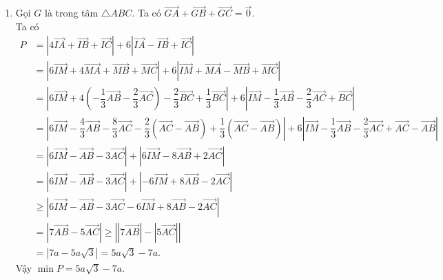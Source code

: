 \begin{bt}
{\begin{enumerate}
\begin{align*}
				&\overrightarrow{BM}=2 \overrightarrow{MC}
				\\
				\Leftrightarrow\,\,&\overrightarrow{BA}+\overrightarrow{AM}=2\left( \overrightarrow{MA}+\overrightarrow{AC}\right)
				\\
				\Leftrightarrow\,\,&-\overrightarrow{AB}+\overrightarrow{AM}=2\left(- \overrightarrow{AM}+\overrightarrow{AC}\right)
				\\
				\Leftrightarrow\,\,&3\overrightarrow{AM}= \overrightarrow{AB}+2\overrightarrow{AC}
				\\
				\Leftrightarrow\,\,&\overrightarrow{AM}=\dfrac{1}{3} \overrightarrow{AB}+\dfrac{2}{3} \overrightarrow{AC}.
			\end{align*}
			\item Gọi $G$ là trong tâm $\triangle ABC$. Ta có $\overrightarrow{GA}+\overrightarrow{GB}+\overrightarrow{GC}=\overrightarrow{0}$.
			\\
			Ta có 
			\allowdisplaybreaks
			\begin{align*}
				P&=\left| 4\overrightarrow{IA}+\overrightarrow{IB}+\overrightarrow{IC}\right|+6\left|\overrightarrow{IA}-\overrightarrow{IB}+\overrightarrow{IC}\right|
				\\
				&=\left| 6\overrightarrow{IM}+4\overrightarrow{MA}+\overrightarrow{MB}+\overrightarrow{MC}\right|+6\left|\overrightarrow{IM}+\overrightarrow{MA}-\overrightarrow{MB}+\overrightarrow{MC}\right|
				\\
				&=\left| 6\overrightarrow{IM}+4\left(-\dfrac{1}{3} \overrightarrow{AB}-\dfrac{2}{3} \overrightarrow{AC}\right)-\dfrac{2}{3}\overrightarrow{BC}+\dfrac{1}{3}\overrightarrow{BC}\right|+6\left|\overrightarrow{IM}-\dfrac{1}{3} \overrightarrow{AB}-\dfrac{2}{3} \overrightarrow{AC}+\overrightarrow{BC}\right|
				\\
				&=\left| 6\overrightarrow{IM}-\dfrac{4}{3} \overrightarrow{AB}-\dfrac{8}{3} \overrightarrow{AC}-\dfrac{2}{3}\left(\overrightarrow{AC}-\overrightarrow{AB}\right)+\dfrac{1}{3}\left(\overrightarrow{AC}-\overrightarrow{AB}\right)\right|+6\left|\overrightarrow{IM}-\dfrac{1}{3} \overrightarrow{AB}-\dfrac{2}{3} \overrightarrow{AC}+\overrightarrow{AC}-\overrightarrow{AB}\right|
				\\
				&=\left| 6\overrightarrow{IM}-\overrightarrow{AB}-3\overrightarrow{AC}\right|+\left|6\overrightarrow{IM}-8\overrightarrow{AB}+2\overrightarrow{AC}\right|
				\\
				&=\left| 6\overrightarrow{IM}-\overrightarrow{AB}-3\overrightarrow{AC}\right|+\left|-6\overrightarrow{IM}+8\overrightarrow{AB}-2\overrightarrow{AC}\right|
				\\
				&\geq \left| 6\overrightarrow{IM}-\overrightarrow{AB}-3\overrightarrow{AC}-6\overrightarrow{IM}+8\overrightarrow{AB}-2\overrightarrow{AC}\right|
				\\
				&=\left| 7\overrightarrow{AB}-5\overrightarrow{AC}\right|\geq \left| \left|7\overrightarrow{AB}\right|-\left|5\overrightarrow{AC}\right|\right|
				\\
				&=\left|7a-5a\sqrt{3}\right|=5a\sqrt{3}-7a.
			\end{align*}
		Vậy $\min P=5a\sqrt{3}-7a$.
		\end{enumerate}
	}
\end{bt}

